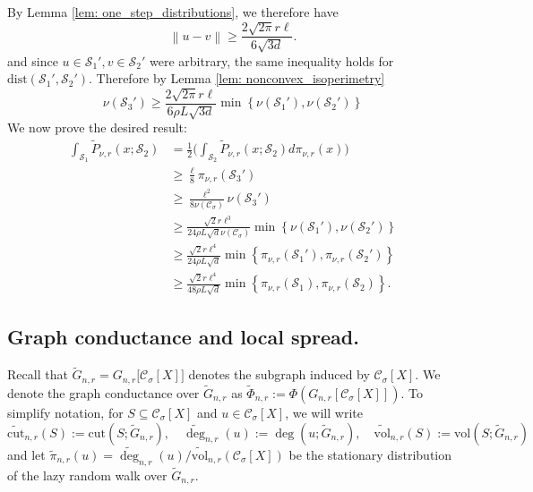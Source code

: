 \documentclass[11pt,twoside]{article}
\newcommand{\set}[1]{\left\{#1\right\}}
\newcommand{\vol}{\mathrm{vol}}
\newcommand{\cut}{\mathrm{cut}}
\newcommand{\norm}[1]{\left\lVert#1\right\rVert}
\newcommand{\1}{\mathbf{1}}
\newcommand{\Xbf}{X}             %
\newcommand{\Sset}{\mathcal{S}}
\newcommand{\Cset}{\mathcal{C}}
\newcommand{\Csig}{\Cset_{\sigma}}
\begin{document}
By Lemma \ref{lem: one_step_distributions}, we therefore have
\begin{equation*}
\norm{u - v} \geq \frac{2 \sqrt{2 \pi } r \ell}{6\sqrt{3 d}}.
\end{equation*}
and since $u \in \Sset_1', v \in \Sset_2'$ were arbitrary, the same inequality holds for $\mathrm{dist}(\Sset_1', \Sset_2')$. Therefore by Lemma \ref{lem: nonconvex_isoperimetry}
\begin{equation*}
\nu(\Sset_3') \geq  \frac{2 \sqrt{2 \pi} r \ell}{6 \rho L \sqrt{3 d}} \min \set{\nu(\Sset_1'), \nu(\Sset_2')}
\end{equation*}
We now prove the desired result:
\begin{align*}
\int_{\Sset_1} \widetilde{P}_{\nu,r}(x; \Sset_2) & = \frac{1}{2} \biggl(\int_{\Sset_2} \widetilde{P}_{\nu,r}(x; \Sset_2)  d \pi_{\nu,r}(x) \biggr) \\
& \geq \frac{\ell}{8} \pi_{\nu,r}(\Sset_3') \\
& \geq \frac{\ell^2}{8 \nu(\Csig)} \nu(\Sset_3') \\
& \geq \frac{\sqrt{2} r \ell^3}{24 \rho L \sqrt{d} \nu(\Csig)} \min \set{\nu(\Sset_1'), \nu(\Sset_2')} \\
& \geq \frac{\sqrt{2} r \ell^4}{24 \rho L \sqrt{d}} \min \set {\pi_{\nu,r}(\Sset_1'), \pi_{\nu,r}(\Sset_2')} \\
& \geq \frac{\sqrt{2} r \ell^4}{48 \rho L \sqrt{d}} \min \set {\pi_{\nu,r}(\Sset_1), \pi_{\nu,r}(\Sset_2)}.
\end{align*}

\subsection{Graph conductance and local spread.}
\label{sec: graph_conductance_and_local_spread}

Recall that $\widetilde{G}_{n,r} = G_{n,r}\bigl[\Csig[\Xbf]\bigr]$ denotes the subgraph induced by $\Csig[\Xbf]$. We denote the graph conductance over $\widetilde{G}_{n,r}$ as $\widetilde{\Phi}_{n,r} := \Phi(G_{n,r}[\Csig[\Xbf]])$. To simplify notation, for $S \subseteq \Csig[\Xbf]$ and $u \in \Csig[\Xbf]$, we will write
\begin{equation*}
\widetilde{\cut}_{n,r}(S) := \cut(S; \widetilde{G}_{n,r}), \quad \widetilde{\deg}_{n,r}(u) := \deg(u; \widetilde{G}_{n,r}), \quad 
\widetilde{\vol}_{n,r}(S) := \vol(S; \widetilde{G}_{n,r})
\end{equation*}
and let $\widetilde{\pi}_{n,r}(u) = \widetilde{\deg}_{n,r}(u)/\widetilde{\vol}_{n,r}(\Csig[\Xbf])$ be the stationary distribution of the lazy random walk over $\widetilde{G}_{n,r}$.
\end{document}
